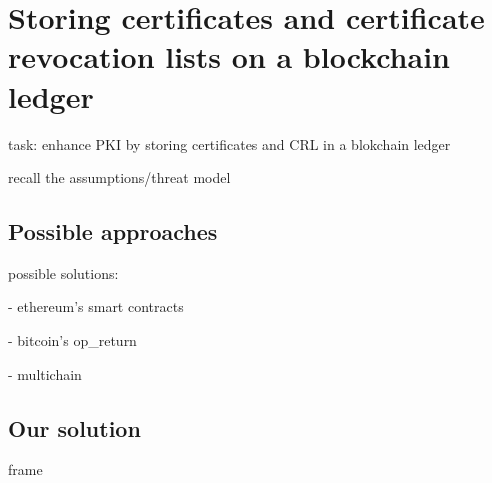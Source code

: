 \section[Storing certificates on a ledger]{Storing certificates and
certificate revocation lists on a blockchain ledger}

\begin{frame}
task: enhance PKI by storing certificates
and CRL
in a blokchain ledger

recall the assumptions/threat model
\end{frame}

\subsection[subsec1]{Possible approaches}

\begin{frame}
possible solutions:

- ethereum's smart contracts

- bitcoin's op\_return

- multichain
\end{frame}

\subsection[subsec2]{Our solution}

\begin{frame}
frame
\end{frame}